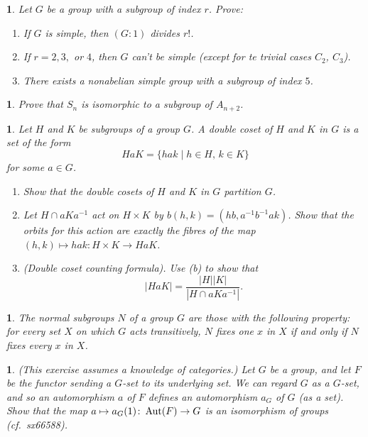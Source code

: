 \documentclass[a4paper,11pt,final]{memoir}%
\newtheorem{exercise}[Y]{}
\theoremstyle{nonumberplain}
\begin{document}
\begin{exercise}
\label{x32} Let $G$ be a group with a subgroup of index $r$. Prove:

\begin{enumerate}
\item If $G$ is simple, then $(G:1)$ divides $r!$.

\item If $r=2,3,$ or $4$, then $G$ can't be simple (except for te trivial
cases $C_{2}$, $C_{3}$).

\item There exists a nonabelian simple group with a subgroup of index $5$.
\end{enumerate}
\end{exercise}

\begin{exercise}
\label{x33} Prove that $S_{n}$ is isomorphic to a subgroup of $A_{n+2}$.
\end{exercise}

\begin{exercise}
\label{x33b}Let $H$ and $K$ be subgroups of a group $G$. A \emph{double coset}
of $H$ and $K$ in $G$ is a set of the form%
\[
HaK=\{hak\mid h\in H\text{, }k\in K\}
\]
for some $a\in G$.

\begin{enumerate}
\item Show that the double cosets of $H$ and $K$ in $G$ partition $G$.

\item Let $H\cap aKa^{-1}$ act on $H\times K$ by $b(h,k)=(hb,a^{-1}b^{-1}ak)$.
Show that the orbits for this action are exactly the fibres of the map
$(h,k)\mapsto hak\colon H\times K\rightarrow HaK$.

\item (Double coset counting formula). Use (b) to show that%
\[
|HaK|=\frac{|H||K|}{|H\cap aKa^{-1}|}.
\]

\end{enumerate}
\end{exercise}

\begin{exercise}
\label{x33c}The normal subgroups $N$ of a group $G$ are those with the
following property: for every set $X$ on which $G$ acts transitively, $N$
fixes one $x$ in $X$ if and only if $N$ fixes every $x$ in $X$.
\end{exercise}

\begin{exercise}
\label{x33d}(This exercise assumes a knowledge of categories.) Let $G$ be a
group, and let $F$ be the functor sending a $G$-set to its underlying set. We
can regard $G$ as a $G$-set, and so an automorphism $a$ of $F$ defines an
automorphism $a_{G}$ of $G$ (as a set). Show that the map $a\mapsto
a_{G}(1)\colon\operatorname{Aut}(F)\rightarrow G$ is an isomorphism of groups (cf.\ sx66588).
\end{exercise}
\end{document}
